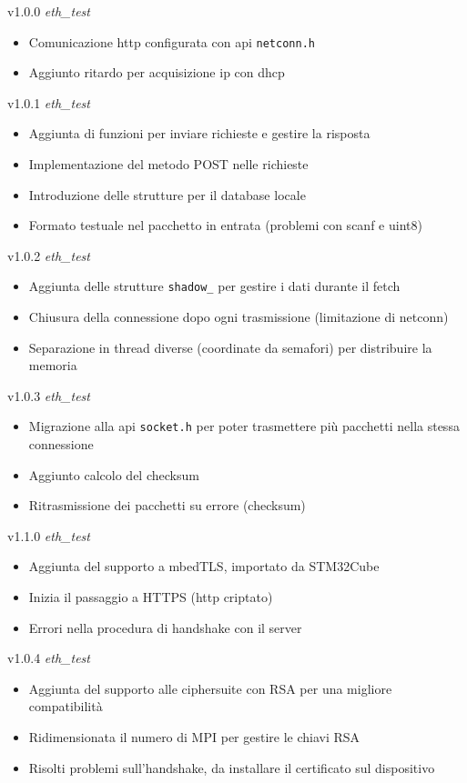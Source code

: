 v1.0.0 \textit{eth\_test}
	\begin{itemize}
		\item Comunicazione http configurata con api \texttt{netconn.h}
		\item Aggiunto ritardo per acquisizione ip con dhcp
	\end{itemize}
v1.0.1 \textit{eth\_test}
	\begin{itemize}
		\item Aggiunta di funzioni per inviare richieste e gestire la risposta
		\item Implementazione del metodo POST nelle richieste
		\item Introduzione delle strutture per il database locale
		\item Formato testuale nel pacchetto in entrata (problemi con scanf e uint8)
	\end{itemize}
v1.0.2 \textit{eth\_test}
	\begin{itemize}
		\item Aggiunta delle strutture \texttt{shadow\_} per gestire i dati durante il fetch
		\item Chiusura della connessione dopo ogni trasmissione (limitazione di netconn)
		\item Separazione in thread diverse (coordinate da semafori) per distribuire la memoria
	\end{itemize}
v1.0.3 \textit{eth\_test}
	\begin{itemize}
		\item Migrazione alla api \texttt{socket.h} per poter trasmettere pi\`{u} pacchetti nella stessa connessione
		\item Aggiunto calcolo del checksum 
		\item Ritrasmissione dei pacchetti su errore (checksum)
	\end{itemize}
v1.1.0 \textit{eth\_test}
	\begin{itemize}
		\item Aggiunta del supporto a mbedTLS, importato da STM32Cube
		\item Inizia il passaggio a HTTPS (http criptato)
		\item Errori nella procedura di handshake con il server
	\end{itemize}
v1.0.4 \textit{eth\_test}
	\begin{itemize}
		\item Aggiunta del supporto alle ciphersuite con RSA per una migliore compatibilit\`{a}
		\item Ridimensionata il numero di MPI per gestire le chiavi RSA
		\item Risolti problemi sull'handshake, da installare il certificato sul dispositivo
	\end{itemize}
